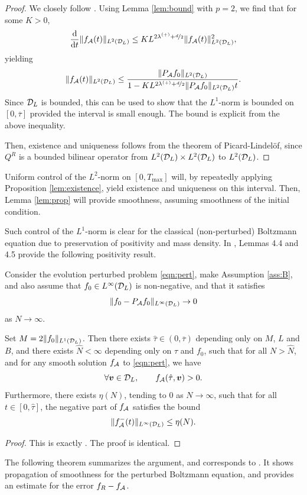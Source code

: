 \begin{proof}
  We closely follow \cite[Proposition 4.3]{Filbet2011asm}. Using Lemma
  \ref{lem:bound} with $p=2$, we find that for some $K>0$,
  $$
  \frac{\mathrm{d}}{\mathrm{d} t}\|f_{\mathcal{A}}(t)\|_{L^2(\mathcal{D}_L)} \le
  KL^{2\lambda^{(+)}+\nicefrac{d}{2}}\|f_{\mathcal{A}}(t)\|_{L^2(\mathcal{D}_L)}^2,
  $$
  yielding
  $$
  \|f_{\mathcal{A}}(t)\|_{L^2(\mathcal{D}_L)} \leq \frac{\|P_{\mathcal{A}} f_0\|_{L^2(\mathcal{D}_L)}}
  {1-KL^{2\lambda^{(+)}+\nicefrac{d}{2}}\|P_{\mathcal{A}} f_0\|_{L^2(\mathcal{D}_L)}t}.
  $$
  Since $\mathcal{D}_L$ is bounded, this can be used to show that the $L^1$-norm is
  bounded on $[0,\overline{\tau}]$ provided the interval is small enough. The
  bound is explicit from the above inequality.
  
  Then, existence and uniqueness follows from the theorem of Picard-Lindelöf,
  since $Q^R$ is a bounded bilinear operator from $L^2(\mathcal{D}_L)\times L^2(\mathcal{D}_L)$ to
  $L^2(\mathcal{D}_L)$.
\end{proof}

Uniform control of the $L^2$-norm on $[0,T_\mathrm{max}]$ will, by repeatedly
applying Proposition \ref{lem:existence}, yield existence and uniqueness on
this interval. Then, Lemma \ref{lem:prop} will provide smoothness, assuming
smoothness of the initial condition.

Such control of the $L^1$-norm is clear for the classical (non-perturbed)
Boltzmann equation due to preservation of positivity and mass density. In
\cite{Filbet2011asm}, Lemmas 4.4 and 4.5 provide the following positivity result.
\begin{lemma} \label{lem:positivity}
    Consider the evolution perturbed problem \eqref{eqn:pert}, make Assumption \ref{ass:B},
    and also assume that $f_0\in L^\infty(\mathcal{D}_L)$ is non-negative, and that it
    satisfies
    $$
        \|f_0-P_{\mathcal{A}} f_0\|_{L^\infty(\mathcal{D}_L)} \to 0
    $$
    as $N\to\infty$.

    Set $M=2\|f_0\|_{L^1(\mathcal{D}_L)}$. Then there exists $\hat{\tau} \in
    (0,\overline{\tau})$ depending only on $M$, $L$ and $B$, and there exists
    $\hat{N}<\infty$ depending only on $\hat{\tau}$ and $f_0$, such that for
    all $N > \hat{N}$, and for any smooth solution $f_{\mathcal{A}}$ to \eqref{eqn:pert},
    we have
    $$
        \forall {\bm v}\in\mathcal{D}_L, \qquad f_{\mathcal{A}}(\hat{\tau},{\bm v}) > 0.
    $$
    Furthermore, there exists $\eta(N)$, tending to $0$ as $N\to\infty$, such
    that for all $t\in[0,\hat{\tau}]$, the negative part of $f_{\mathcal{A}}$ satisfies
    the bound
    $$
        \|f_{\mathcal{A}}^{-}(t)\|_{L^\infty(\mathcal{D}_L)} \leq \eta(N).
    $$
\end{lemma}
\begin{proof}
    This is exactly \cite[Lemma 4.5]{Filbet2011asm}. The proof is identical.
\end{proof}
The following theorem summarizes the argument, and corresponds to 
\cite[Proposition 4.6]{Filbet2011asm}. It shows propagation of smoothness for the
perturbed Boltzmann equation, and provides an estimate for the error $f_R-f_{\mathcal{A}}$.

